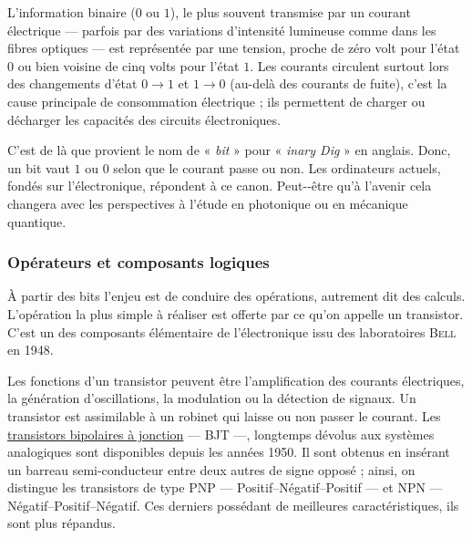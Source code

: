 L'information binaire ($0$ ou $1$), le plus souvent transmise par un courant électrique --- parfois par des variations d'intensité lumineuse com\-me dans les fibres optiques --- est représentée par une tension, proche de zéro volt pour l'état $0$ ou bien voisine de cinq volts pour l'état $1$. Les courants circulent surtout lors des changements d'état $0 \rightarrow 1$ et $1 \rightarrow 0$ (au-delà des courants de fuite), c'est la cause principale de consommation électrique ; ils permettent de charger ou décharger les capacités des circuits électroniques. 

C'est de là que provient le nom de « \textit{bit} » pour « \textit{inary Dig} » en anglais. Donc, un bit vaut $1$ ou $0$ selon que le courant passe ou non. 
Les ordinateurs actuels, fondés sur l'électronique, répondent à ce canon. Peut-­‐être qu'à l'avenir cela changera avec les perspectives à l'étude en photonique ou en mécanique quantique.


\subsubsection[Opérateurs et composants logiques]{Opérateurs et composants logiques}
\label{subsub:V.1.1.2}

%
À partir des bits l'enjeu est de conduire des opérations, autrement dit des calculs. L'opération la plus simple à réaliser est offerte par ce qu'on appelle un transistor. C'est un des composants élémentaire de l'électronique issu des laboratoires \textsc{Bell} en 1948. 

Les fonctions d'un transistor peuvent être l'amplification des courants électriques, la génération d'oscillations, la modulation ou la détection de signaux. 
Un transistor est assimilable à un robinet qui laisse ou non passer le courant. Les \href{https://fr.wikipedia.org/wiki/Transistor\_bipolaire}{transistors bipolaires à jonction} --- BJT ---, longtemps dévolus aux systèmes analogiques sont disponibles depuis les années 1950. Il sont obtenus en insérant un barreau semi-conducteur entre deux autres de signe opposé ; ainsi, on distingue les transistors de type PNP --- Positif--Négatif--Positif --- et NPN --- Négatif--Positif--Négatif. Ces derniers possédant de meilleures caractéristiques, ils sont plus répandus.

